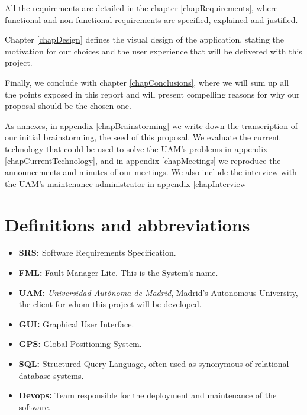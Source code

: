 \documentclass{report}
\begin{document}
All the requirements are detailed in the chapter \ref{chapRequirements}, where functional and non-functional requirements are specified, explained and justified.

Chapter \ref{chapDesign} defines the visual design of the application, stating the motivation for our choices and the user experience that will be delivered with this project.

Finally, we conclude with chapter \ref{chapConclusions}, where we will sum up all the points exposed in this report and will present compelling reasons for why our proposal should be the chosen one.

As annexes, in appendix \ref{chapBrainstorming} we write down the transcription of our initial brainstorming, the seed of this proposal. We evaluate the current technology that could be used to solve the UAM's problems in appendix \ref{chapCurrentTechnology}, and in appendix \ref{chapMeetings} we reproduce the announcements and minutes of our meetings. We also include the interview with the UAM's maintenance administrator in appendix \ref{chapInterview}


\section{Definitions and abbreviations}

\begin{itemize}
\item \textbf{SRS: } Software Requirements Specification.

\item \textbf{FML: } Fault Manager Lite. This is the System's name.

\item \textbf{UAM: } \textit{Universidad Autónoma de Madrid}, Madrid's Autonomous University, the client for whom this project will be developed.

\item \textbf{GUI: } Graphical User Interface.

\item \textbf{GPS: } Global Positioning System.

\item \textbf{SQL: } Structured Query Language, often used as synonymous of relational database systems.

\item \textbf{Devops: } Team responsible for the deployment and maintenance of the software.

\end{itemize}
\end{document}
